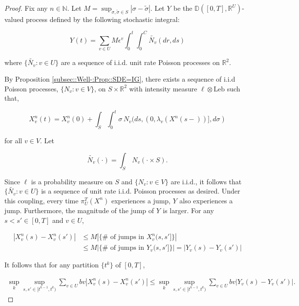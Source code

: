\documentclass[12pt]{article}
\newcommand{\mb}{\mathbb}
\newcommand{\te}{\text}
\newcommand{\ep}{\epsilon}
\newcommand{\ind}{\hspace{24pt}}
\newcommand{\cad}{\mb{D}}							%
\renewcommand{\v}{v}							%
\renewcommand{\U}{U}							%
\renewcommand{\S}{S}							%
\newcommand{\s}{\sigma}							%
\renewcommand{\b}{b}							%
\newcommand{\ev}[1]{\ep^{#1}}					%
\newcommand{\T}{T}								%
\renewcommand{\t}{t}							%
\renewcommand{\tt}{s}							%
\newcommand{\ttt}{s'}							%
\renewcommand{\ss}[1]{^{#1}}					%
\newcommand{\poiss}[1]{N_{#1}}						%
\newcommand{\leb}{\te{Leb}}							%
\newcommand{\pup}[1]{^{#1}}							%
\renewcommand{\ss}{\tilde{\s}}					%
\newcommand{\V}{V}									%
\renewcommand{\r}{r}								%
\renewcommand{\it}{k}								%
\newcommand{\numb}{n}								%
\newcommand{\piV}[2]{\pi_{#1}^{#2}}					%
\newcommand{\rxvtn}[3]{X_{#1}^{#3}(#2)}				%
\newcommand{\rxvtt}[2]{Y_{#1}{(#2)}}				%
\newcommand{\rxvtsn}[3]{X_{#1}^{#3}{#2}}			%
\newcommand{\rxvtts}[2]{Y_{#1}{#2}}					%
\newcommand{\rate}[1]{\lambda_{#1}}					%
\newcommand{\const}[1]{C_{#1}}						%
\newcommand{\Sm}{\ell}								%
\newcommand{\alt}{\widetilde}						%
\begin{document}
\begin{proof}
Fix any \(\numb \in \mb{N}\). Let \(M = \sup_{\s,\ss \in \S} |\s - \ss|\). Let \(\rxvtts{}{}\) be the \(\cad([0,\T],\mb{R}^\U)\)-valued process defined by the following stochastic integral:

\[\rxvtt{}{\t} = \sum_{\v \in \U}M\ev{\v}\int_0^\t\int_0^{\const{}}\alt{\poiss{\v}}(d\r, d\tt)\]

where \(\{\alt{\poiss{\v}}:\v \in \U\}\) are a sequence of i.i.d. unit rate Poisson processes on \(\mb{R}^2\). 

\ind By Proposition \ref{subsec::Well-:Prop::SDE=IG}, there exists a sequence of i.i.d Poisson processes, \(\{\poiss{\v}:\v\in \V\}\), on \(\S\times\mb{R}^2\) with intensity measure \(\Sm\otimes \leb\) such that,

\[\rxvtn{\v}{\t}{\numb} = \rxvtn{\v}{0}{\numb} + \int_\S\int_0^\t \s\,\poiss{\v}(d\tt,(0,\rate{\v}(\rxvtn{}{\tt-}{\numb})],d\s)\]

for all \(\v\in \V\). Let

\[\alt{\poiss{\v}}(\cdot) = \int_\S\,\poiss{\v}(\cdot\times \S).\]

Since \(\Sm\) is a probability measure on \(\S\) and \(\{\poiss{\v}:\v\in \V\}\) are i.i.d., it follows that \(\{\alt{\poiss{\v}}:\v\in \U\}\) is a sequence of unit rate i.i.d. Poisson processes as desired. Under this coupling, every time \(\piV{\U}{\T}(\rxvtsn{}{}{\numb})\) experiences a jump, \(\rxvtts{}{}\) also experiences a jump. Furthermore, the magnitude of the jump of \(\rxvtts{}{}\) is larger. For any \(\tt<\ttt\in [0,\T]\) and \(\v\in \U\),

\begin{align*}
|\rxvtn{\v}{\tt}{\numb} - \rxvtn{\v}{\ttt}{\numb}|&\leq M\left|\{\#\te{ of jumps in }\rxvtsn{\v}{(\tt,\ttt]}{\numb}\}\right| \\
&\leq M\left|\{\#\te{ of jumps in }\rxvtts{\v}{(\tt,\ttt]}\}\right| = \left|\rxvtt{\v}{\tt} - \rxvtt{\v}{\ttt}\right|
\end{align*}

It follows that for any partition \(\{\t\pup{\it}\}\) of \([0,\T]\),

\begin{align*}
\sup_\it\sup_{\tt,\ttt \in [\t\pup{\it-1},\t\pup{\it})} \sum_{\v\in \U} \b{\v}|\rxvtn{\v}{\tt}{\numb} - \rxvtn{\v}{\ttt}{\numb}|\leq \sup_\it\sup_{\tt,\ttt \in [\t\pup{\it-1},\t\pup{\it})} \sum_{\v\in \U} \b{\v}|\rxvtt{\v}{\tt} - \rxvtt{\v}{\ttt}|.
\end{align*}


\end{proof}
\end{document}
